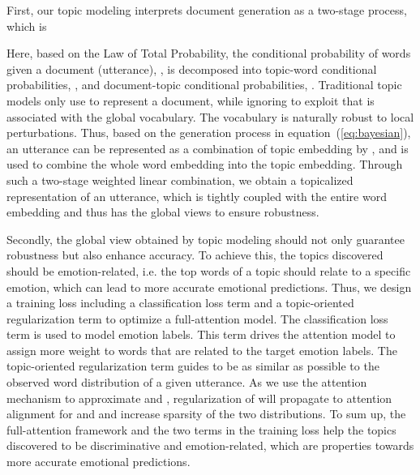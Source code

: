 \documentclass{ecai}
\begin{document}
First, our topic modeling interprets document generation as a two-stage process, which is

Here, based on the Law of Total Probability, the conditional probability of words given a document (utterance), , is decomposed into topic-word conditional probabilities, , and document-topic conditional probabilities, . Traditional topic models only use  to represent a document, while ignoring to exploit  that is associated with the global vocabulary. The vocabulary is naturally robust to local perturbations. Thus, based on the generation process in equation~(\ref{eq:bayesian}), an utterance can be represented as a combination of topic embedding by , and  is used to combine the whole word embedding into the topic embedding. Through such a two-stage weighted linear combination, we obtain a topicalized representation of an utterance, which is tightly coupled with the entire word embedding and thus has the global views to ensure robustness.

Secondly, the global view obtained by topic modeling should not only guarantee robustness but also enhance accuracy. To achieve this, the topics discovered should be emotion-related, i.e. the top words of a topic should relate to a specific emotion, which can lead to more accurate emotional predictions. Thus, we design a training loss including a classification loss term and a topic-oriented regularization term to optimize a full-attention model. The classification loss term is used to model emotion labels. This term drives the attention model to assign more weight to words that are related to the target emotion labels. The topic-oriented regularization term guides  to be as similar as possible to the observed word distribution of a given utterance. As we use the attention mechanism to approximate  and , regularization of  will propagate to attention alignment for  and  and increase sparsity of the two distributions. To sum up, the full-attention framework and the two terms in the training loss help the topics discovered to be discriminative and emotion-related, which are properties towards more accurate emotional predictions.
\end{document}
